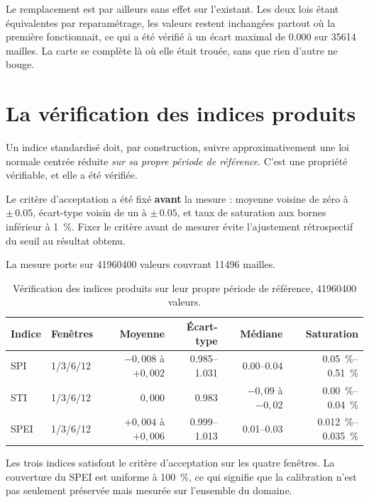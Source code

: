 Le remplacement est par ailleurs sans effet sur l'existant. Les deux lois étant équivalentes par
reparamétrage, les valeurs restent inchangées partout où la première fonctionnait, ce qui a été
vérifié à un écart maximal de \num{0,000} sur \num{35614} mailles. La carte se complète là où elle était trouée, sans que rien d'autre ne bouge.

\section{La vérification des indices produits}

Un indice standardisé doit, par construction, suivre approximativement une loi normale centrée
réduite \emph{sur sa propre période de référence}. C'est une propriété vérifiable, et elle a été
vérifiée.

Le critère d'acceptation a été fixé \textbf{avant} la mesure : moyenne
voisine de zéro à $\pm\,\num{0,05}$, écart-type voisin de un à $\pm\,\num{0,05}$, et taux de
saturation aux bornes inférieur à \SI{1}{\percent}. Fixer le critère avant de mesurer évite
l'ajustement rétrospectif du seuil au résultat obtenu.

La mesure porte sur \num{41960400} valeurs couvrant \num{11496} mailles.

\begin{table}[H]
\centering
\caption{Vérification des indices produits sur leur propre période de référence, \num{41960400} valeurs.}
\label{tab:validation-indices}
\begin{tabularx}{\textwidth}{@{}lXrrrr@{}}
\toprule
\textbf{Indice} & \textbf{Fenêtres} & \textbf{Moyenne} & \textbf{Écart-type} & \textbf{Médiane}
& \textbf{Saturation} \\
\midrule
SPI  & 1/3/6/12 & $-0{,}008$ à $+0{,}002$ & \numrange{0,985}{1,031} & \numrange{0,00}{0,04} & \SIrange{0,05}{0,51}{\percent} \\
STI  & 1/3/6/12 & $0{,}000$               & \num{0,983}            & $-0{,}09$ à $-0{,}02$ & \SIrange{0,00}{0,04}{\percent} \\
SPEI & 1/3/6/12 & $+0{,}004$ à $+0{,}006$ & \numrange{0,999}{1,013} & \numrange{0,01}{0,03} & \SIrange{0,012}{0,035}{\percent} \\
\bottomrule
\end{tabularx}
\end{table}

Les trois indices satisfont le critère d'acceptation sur les quatre fenêtres. La couverture du
SPEI est uniforme à \SI{100}{\percent}, ce qui signifie que la calibration n'est pas seulement
préservée mais mesurée sur l'ensemble du domaine.

